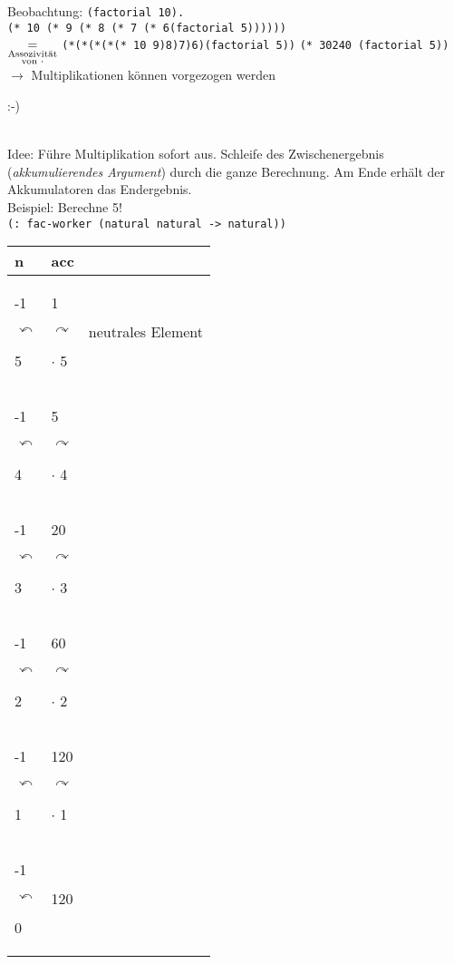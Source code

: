 Beobachtung: \lstinline!(factorial 10).!\\
\lstinline!(* 10 (* 9 (* 8 (* 7 (* 6(factorial 5))))))!\\
$\underset{\substack{\text{Assozivität}\\
\text{von } \cdot}}{=}$ \lstinline|(*(*(*(*(* 10 9)8)7)6)(factorial 5))| \eval \lstinline|(* 30240 (factorial 5))|\\
$\rightarrow$ Multiplikationen können vorgezogen werden \begin{turn}{}
:-)
\end{turn}\\
Idee: Führe Multiplikation sofort aus. Schleife des Zwischenergebnis ({\em akkumulierendes Argument}) durch die ganze Berechnung. Am Ende erhält der Akkumulatoren das Endergebnis.\\
Beispiel: Berechne 5!\\
\lstinline!(: fac-worker (natural natural -> natural))!\\
\begin{tabular}{l|ll}
n & acc\\
\hline {\tiny-1}\begin{turn}{45}
$\curvearrowleft$
\end{turn}5 & 1 \begin{turn}{-45}
$\curvearrowright$
\end{turn} $\cdot$ {\tiny 5} & neutrales Element\\
{\tiny-1}\begin{turn}{45}
$\curvearrowleft$
\end{turn}4 & 5 \begin{turn}{-45}
$\curvearrowright$
\end{turn} $\cdot$ {4} \\
{\tiny-1}\begin{turn}{45}
{$\curvearrowleft$}
\end{turn}3 & 20 \begin{turn}{-45}
$\curvearrowright$
\end{turn} $\cdot$ {3}\\
{\tiny-1}\begin{turn}{45}
$\curvearrowleft$
\end{turn}2 & 60 \begin{turn}{-45}
$\curvearrowright$
\end{turn} $\cdot$ { 2}\\
{\tiny-1}\begin{turn}{45}
$\curvearrowleft$
\end{turn}1 & 120 \begin{turn}{-45}
$\curvearrowright$
\end{turn} $\cdot$ {1}\\
{\tiny-1}\begin{turn}{45}
$\curvearrowleft$
\end{turn}0 & 120
\end{tabular}
